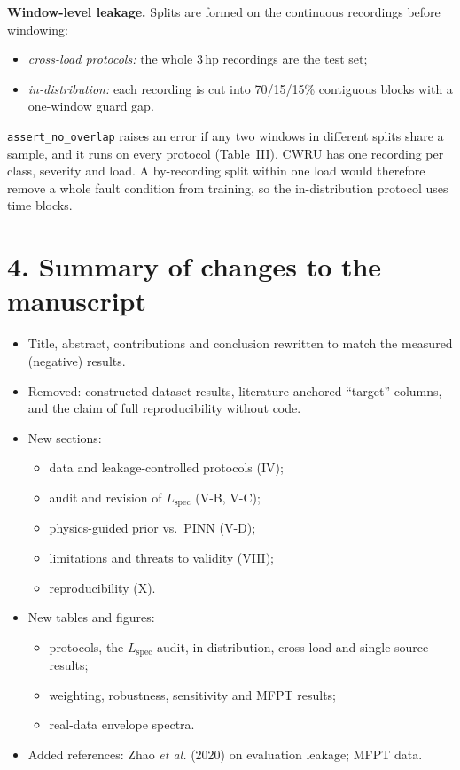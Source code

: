 \documentclass[11pt]{article}
\newcommand{\Lspec}{L_{\mathrm{spec}}}
\begin{document}
\textbf{Window-level leakage.} Splits are formed on the continuous recordings
before windowing:
\begin{itemize}[leftmargin=*]
\item \emph{cross-load protocols:} the whole 3\,hp recordings are the test set;
\item \emph{in-distribution:} each recording is cut into 70/15/15\% contiguous
blocks with a one-window guard gap.
\end{itemize}
\texttt{assert\_no\_overlap} raises an error if any two windows in different
splits share a sample, and it runs on every protocol (Table~III). CWRU has one
recording per class, severity and load. A by-recording split within one load
would therefore remove a whole fault condition from training, so the
in-distribution protocol uses time blocks.

\section*{4. Summary of changes to the manuscript}
\begin{itemize}[leftmargin=*]
\item Title, abstract, contributions and conclusion rewritten to match the
measured (negative) results.
\item Removed: constructed-dataset results, literature-anchored ``target''
columns, and the claim of full reproducibility without code.
\item New sections:
  \begin{itemize}
  \item data and leakage-controlled protocols (IV);
  \item audit and revision of $\Lspec$ (V-B, V-C);
  \item physics-guided prior vs.\ PINN (V-D);
  \item limitations and threats to validity (VIII);
  \item reproducibility (X).
  \end{itemize}
\item New tables and figures:
  \begin{itemize}
  \item protocols, the $\Lspec$ audit, in-distribution, cross-load and single-source results;
  \item weighting, robustness, sensitivity and MFPT results;
  \item real-data envelope spectra.
  \end{itemize}
\item Added references: Zhao \emph{et al.} (2020) on evaluation leakage; MFPT data.
\end{itemize}
\end{document}
